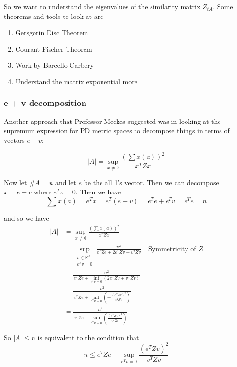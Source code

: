 \documentclass[11pt]{article}
\theoremstyle{definition}
\theoremstyle{definition}
\theoremstyle{plain}
\theoremstyle{plain}
\theoremstyle{plain}
\theoremstyle{definition}
\begin{document}
So we want to understand the eigenvalues of the similarity matrix $Z_{tA}$. Some theorems and tools to look at are
\begin{enumerate}
\item Gersgorin Disc Theorem
\item Courant-Fischer Theorem
\item Work by Barcello-Carbery
\item Understand the matrix exponential more
\end{enumerate}

\subsubsection*{e + v decomposition}

Another approach that Professor Meckes suggested was in looking at the supremum expression for PD metric spaces to decompose things in terms of vectors $e + v$:

\begin{equation*}
\vert A \vert = \sup\limits_{x\neq0}\frac{\left(\sum x(a)\right)^2}{x^T Z x}
\end{equation*}

Now let $\#A = n$ and let $e$ be the all 1's vector. Then we can decompose $x = e + v$ where $e^T v = 0$. Then we have
\begin{equation*}
\sum x(a) = e^T x = e^T(e + v) = e^Te + e^Tv = e^Te = n
\end{equation*}

and so we have
\begin{align*}
\vert A \vert &= \sup\limits_{x\neq0}\frac{\left(\sum x(a)\right)^2}{x^T Z x} \\
&= \sup\limits_{\substack{v \in \mathbb{R}^A \\ e^Tv = 0}}\frac{n^2}{e^TZe + 2e^TZv + v^TZv} \quad\text{Symmetricity of $Z$}\\
&= \frac{n^2}{e^TZe + \inf\limits_{e^Tv = 0}(2e^TZv + v^TZv)} \\
&= \frac{n^2}{e^TZe + \inf\limits_{e^Tv=0}\left(-\frac{(e^TZv)^2}{v^TZv}\right)} \\
&= \frac{n^2}{e^TZe - \sup\limits_{e^Tv=0}\left(\frac{(e^TZv)^2}{v^TZv}\right)}
\end{align*}

So $\vert A \vert \leq n$ is equivalent to the condition that
\begin{equation*}
n \leq e^TZe - \sup\limits_{e^Tv = 0}\frac{(e^TZv)^2}{v^TZv}
\end{equation*}
\end{document}
